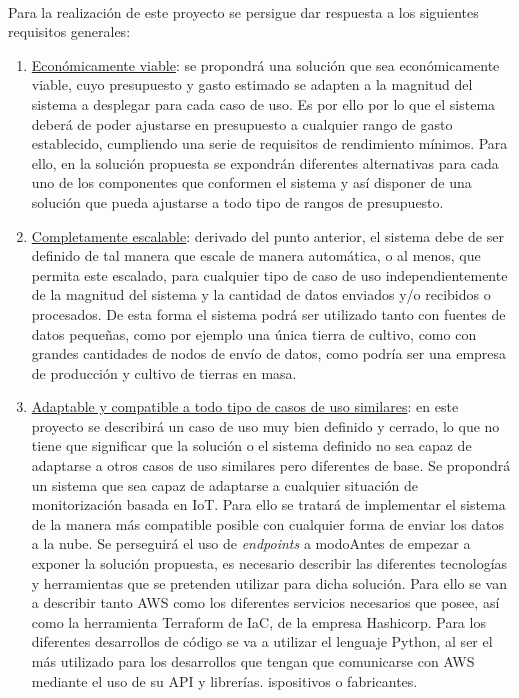 \documentclass[../../memoria.tex]{subfiles}
\begin{document}
\paragraph{}
Para la realización de este proyecto se persigue dar respuesta a los siguientes requisitos generales:

\begin{enumerate}
    \item \uline{Económicamente viable}: se propondrá una solución que sea económicamente viable, cuyo presupuesto y gasto estimado se adapten a la magnitud del sistema a desplegar para cada caso de uso. Es por ello por lo que el sistema deberá de poder ajustarse en presupuesto a cualquier rango de gasto establecido, cumpliendo una serie de requisitos de rendimiento mínimos. Para ello, en la solución propuesta se expondrán diferentes alternativas para cada uno de los componentes que conformen el sistema y así disponer de una solución que pueda ajustarse a todo tipo de rangos de presupuesto.

    \item \uline{Completamente escalable}: derivado del punto anterior, el sistema debe de ser definido de tal manera que escale de manera automática, o al menos, que permita este escalado, para cualquier tipo de caso de uso independientemente de la magnitud del sistema y la cantidad de datos enviados y/o recibidos o procesados. De esta forma el sistema podrá ser utilizado tanto con fuentes de datos pequeñas, como por ejemplo una única tierra de cultivo, como con grandes cantidades de nodos de envío de datos, como podría ser una empresa de producción y cultivo de tierras en masa.

    \item \uline{Adaptable y compatible a todo tipo de casos de uso similares}: en este proyecto se describirá un caso de uso muy bien definido y cerrado, lo que no tiene que significar que la solución o el sistema definido no sea capaz de adaptarse a otros casos de uso similares pero diferentes de base. Se propondrá un sistema que sea capaz de adaptarse a cualquier situación de monitorización basada en IoT. Para ello se tratará de implementar el sistema de la manera más compatible posible con cualquier forma de enviar los datos a la nube. Se perseguirá el uso de \textit{endpoints} a modoAntes de empezar a exponer la solución propuesta, es necesario describir las diferentes tecnologías y herramientas que se pretenden utilizar para dicha solución. Para ello se van a describir tanto AWS como los diferentes servicios necesarios que posee, así como la herramienta Terraform de IaC, de la empresa Hashicorp. Para los diferentes desarrollos de código se va a utilizar el lenguaje Python, al ser el más utilizado para los desarrollos que tengan que comunicarse con AWS mediante el uso de su API y librerías. ispositivos o fabricantes.


\end{enumerate}
\end{document}

